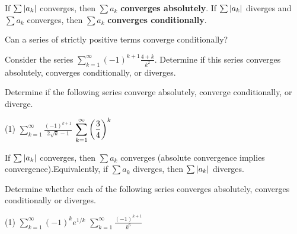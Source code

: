 \documentclass[../mathNotesPreamble]{subfiles}
\begin{document}
  \begin{defn*}
    If $\sum{\left\vert a_k\right\vert}$ converges, then $\sum a_k$ \textbf{converges absolutely}.\newline
    If $\sum{\left\vert a_k\right\vert}$ diverges and $\sum a_k$ converges, then $\sum a_k$ \textbf{converges conditionally}.
  \end{defn*}
  \begin{ex*}
    Can a series of strictly positive terms converge conditionally?
  \end{ex*}
  \begin{ex*}
    Consider the series $\displaystyle\sum_{k=1}^\infty (-1)^{k+1}\frac{4+k}{k^2}$. Determine if this series converges absolutely, converges conditionally, or diverges.
  \end{ex*}
  \pagebreak

  \begin{ex*}
    Determine if the following series converge absolutely, converge conditionally, or diverge.
  \end{ex*}
  \begin{tasks}[after-item-skip=\stretch{1}, label=,item-indent=0pt](1)
    \task $\displaystyle\sum_{k=1}^\infty \frac{(-1)^{k+1}}{2\sqrt{k}-1}$
    \task $\displaystyle\sum_{k=1}^\infty {\left(\frac{3}{4}\right)}^k$
  \end{tasks}
  \pagebreak

  \begin{thmBox*}
    If $\sum {\left\vert a_k\right\vert}$ converges, then $\sum a_k$ converges (absolute convergence implies convergence).\newline Equivalently, if $\sum a_k$ diverges, then $\sum{\left\vert a_k\right\vert}$ diverges.
  \end{thmBox*}
  \begin{ex*}
    Determine whether each of the following series converges absolutely, converges conditionally or diverges.
  \end{ex*}
  \begin{tasks}[after-item-skip=\stretch{1}, label=,item-indent=0pt](1)
    \task $\displaystyle\sum_{k=1}^\infty (-1)^ke^{1/k}$
    \task $\displaystyle\sum_{k=1}^\infty \frac{(-1)^{k+1}}{k^6}$
  \end{tasks}
  \pagebreak
\end{document}
